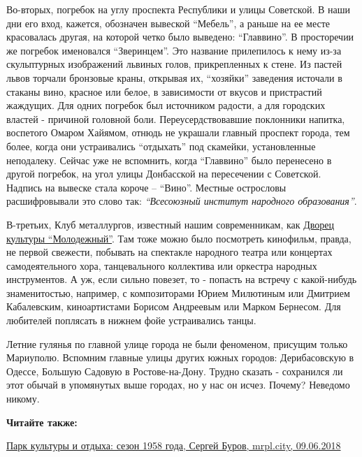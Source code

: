 Во-вторых, погребок на углу проспекта Республики и улицы Советской. В наши дни
его вход, кажется, обозначен вывеской \enquote{Мебель}, а раньше на ее месте
красовалась другая, на которой четко было выведено: \enquote{Главвино}. В просторечии
же погребок именовался \enquote{Зверинцем}. Это название прилепилось к нему из-за
скульптурных изображений львиных голов, прикрепленных к стене. Из пастей львов
торчали бронзовые краны, открывая их, \enquote{хозяйки} заведения источали в стаканы
вино, красное или белое, в зависимости от вкусов и пристрастий жаждущих. Для
одних погребок был источником радости, а для городских властей - причиной
головной боли. Переусердствовавшие поклонники напитка, воспетого Омаром
Хайямом, отнюдь не украшали главный проспект города, тем более, когда они
устраивались \enquote{отдыхать} под скамейки, установленные неподалеку. Сейчас уже не
вспомнить, когда \enquote{Главвино} было перенесено в другой погребок, на угол улицы
Донбасской на пересечении с Советской. Надпись на вывеске стала короче –
\enquote{Вино}. Местные острословы расшифровывали это слово так: \emph{\enquote{Всесоюзный институт
народного образования}}.

В-третьих, Клуб металлургов, известный нашим современникам, как \href{https://mrpl.city/blogs/dk-molodezhnyj}{Дворец культуры
\enquote{Молодежный}}. Там тоже можно было посмотреть кинофильм, правда, не первой
свежести, побывать на спектакле народного театра или концертах самодеятельного
хора, танцевального коллектива или оркестра народных инструментов. А уж, если
сильно повезет, то - попасть на встречу с какой-нибудь знаменитостью, например,
с композиторами Юрием Милютиным или Дмитрием Кабалевским, киноартистами Борисом
Андреевым или Марком Бернесом. Для любителей поплясать в нижнем фойе
устраивались танцы.

Летние гулянья по главной улице города не были феноменом, присущим только
Мариуполю. Вспомним главные улицы других южных городов: Дерибасовскую в Одессе,
Большую Садовую в Ростове-на-Дону. Трудно сказать - сохранился ли этот обычай в
упомянутых выше городах, но у нас он исчез. Почему? Неведомо никому.

\vspace{0.5cm}
\begin{minipage}{0.9\textwidth}
\textbf{Читайте также:} 
  
\href{https://archive.org/details/09_06_2018.sergij_burov.mrpl_city.park_kultury_i_otdyha_sezon_1958_goda}{Парк культуры и отдыха: сезон 1958 года, Сергей Буров, mrpl.city, 09.06.2018}
\end{minipage}
\vspace{0.5cm}
